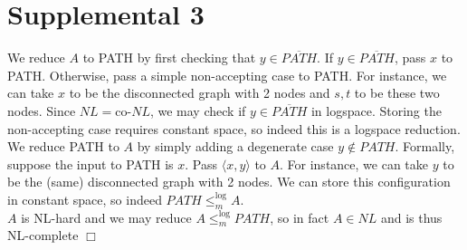 \documentclass{article}
\begin{document}
\section*{Supplemental 3}
We reduce $A$ to PATH by first checking that $y \in \overline{PATH}$. If $y \in \overline{PATH}$, pass $x$ to PATH. Otherwise, pass a simple non-accepting case to PATH. For instance, we can take $x$ to be the disconnected graph with 2 nodes and $s,t$ to be these two nodes. Since $NL = \text{co-}NL$, we may check if $y \in \overline{PATH}$ in logspace. Storing the non-accepting case requires constant space, so indeed this is a logspace reduction.\\
We reduce PATH to $A$ by simply adding a degenerate case $y \notin PATH$. Formally, suppose the input to PATH is $x$. Pass $\langle x,y \rangle$ to $A$. For instance, we can take $y$ to be the (same) disconnected graph with 2 nodes. We can store this configuration in constant space, so indeed $PATH \leqslant_m^{\log} A$.\\
$A$ is NL-hard and we may reduce $A \leqslant_m^{\log} PATH$, so in fact $A \in NL$ and is thus NL-complete $\Box$
\end{document}
